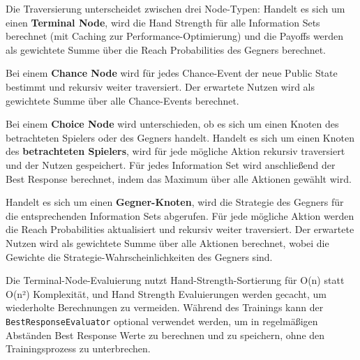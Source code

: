 Die Traversierung unterscheidet zwischen drei Node-Typen:
Handelt es sich um einen \textbf{Terminal Node}, wird die Hand Strength für alle Information Sets berechnet (mit Caching zur Performance-Optimierung) und die Payoffs werden als gewichtete Summe über die Reach Probabilities des Gegners berechnet.

Bei einem \textbf{Chance Node} wird für jedes Chance-Event der neue Public State bestimmt und rekursiv weiter traversiert.
Der erwartete Nutzen wird als gewichtete Summe über alle Chance-Events berechnet.

Bei einem \textbf{Choice Node} wird unterschieden, ob es sich um einen Knoten des betrachteten Spielers oder des Gegners handelt.
Handelt es sich um einen Knoten des \textbf{betrachteten Spielers}, wird für jede mögliche Aktion rekursiv traversiert und der Nutzen gespeichert.
Für jedes Information Set wird anschließend der Best Response berechnet, indem das Maximum über alle Aktionen gewählt wird.

Handelt es sich um einen \textbf{Gegner-Knoten}, wird die Strategie des Gegners für die entsprechenden Information Sets abgerufen.
Für jede mögliche Aktion werden die Reach Probabilities aktualisiert und rekursiv weiter traversiert.
Der erwartete Nutzen wird als gewichtete Summe über alle Aktionen berechnet, wobei die Gewichte die Strategie-Wahrscheinlichkeiten des Gegners sind.

Die Terminal-Node-Evaluierung nutzt Hand-Strength-Sortierung für O(n) statt O(n²) Komplexität, und Hand Strength Evaluierungen werden gecacht, um wiederholte Berechnungen zu vermeiden.
Während des Trainings kann der \texttt{BestResponseEvaluator} optional verwendet werden, um in regelmäßigen Abständen Best Response Werte zu berechnen und zu speichern, ohne den Trainingsprozess zu unterbrechen.
